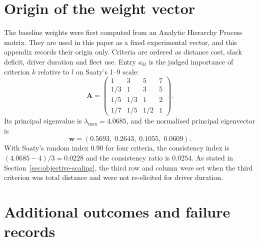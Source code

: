 \documentclass[11pt,a4paper]{article}
\begin{document}
\clearpage
\appendix
\section{Origin of the weight vector}\label{sec:ahp-matrix}

The baseline weights were first computed from an Analytic Hierarchy Process
matrix. They are used in this paper as a fixed experimental vector, and this
appendix records their origin only. Criteria are ordered as distance cost, slack deficit, driver duration and fleet
use. Entry $a_{kl}$ is the judged importance of criterion $k$ relative to $l$
on Saaty's 1--9 scale:
\[
\mathbf{A}=\begin{pmatrix}
1 & 3 & 5 & 7\\
1/3 & 1 & 3 & 5\\
1/5 & 1/3 & 1 & 2\\
1/7 & 1/5 & 1/2 & 1
\end{pmatrix}.
\]
Its principal eigenvalue is $\lambda_{\max}=4.0685$, and the normalised
principal eigenvector is
\[
\mathbf{w}=(0.5693,\;0.2643,\;0.1055,\;0.0609).
\]
With Saaty's random index 0.90 for four criteria, the consistency index is
$(4.0685-4)/3=0.0228$ and the consistency ratio is $0.0254$. As stated in Section~\ref{sec:objective-scaling},
the third row and column were set when the third criterion was total distance
and were not re-elicited for driver duration.

\section{Additional outcomes and failure records}\label{sec:additional}




\clearpage

\clearpage

\begingroup
\small



\endgroup
\end{document}
